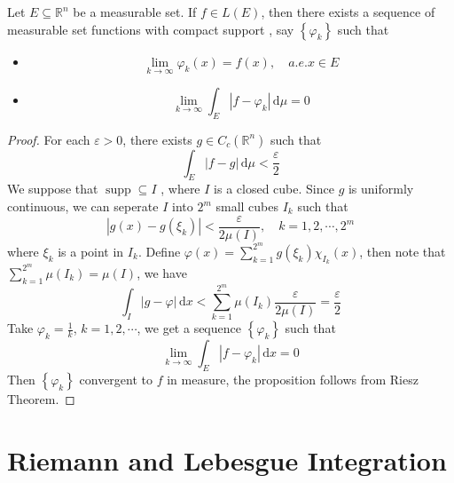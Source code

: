 \documentclass[../main.tex]{subfiles}
\begin{document}
\begin{proposition}{}{}
     Let \(  E\subseteq \mathbb{R} ^{n}  \) be a measurable set. If \(  f \in L\left( E \right)   \), then there exists a sequence of measurable set functions with compact support , say \(  \left\{  \varphi _{k} \right\}  \) such that 
    \begin{itemize}
        \item \[
        \lim_{k\to \infty} \varphi _{k}\left( x \right)= f\left( x \right),\quad a.e.x\in E  
        \]
        \item \[
      \lim_{k\to \infty}\int_{E}\left| f- \varphi _{k} \right|\,\mathrm{d} \mu = 0 
        \]
    \end{itemize}
\end{proposition}
\begin{proof}
    For each \(   \varepsilon > 0  \), there exists \(  g\in C_{c}\left( \mathbb{R}^{n} \right)   \) such that \[
    \int_{E}\left| f-g \right|\,\mathrm{d} \mu < \frac{ \varepsilon  }{2 }  
    \]  We suppose that \(  \operatorname{supp} \subseteq I  \) , where \(  I  \) is a closed cube. Since \(  g  \) is uniformly continuous, we can seperate \(  I  \) into \(  2^{m}  \) small cubes \(  I_{k}  \) such that \[
  \left| g\left( x \right)-g\left(  \xi _{k} \right)   \right|< \frac{ \varepsilon  }{2\mu \left( I \right)  }  ,\quad k= 1,2,\cdots ,2^{m}
    \]      where \(   \xi _{k}  \) is a point in \(  I_{k}  \). Define \(   \varphi \left( x \right)= \sum _{k= 1}^{2^{m}}g\left(  \xi _{k} \right)  \chi _{I_{k}}\left( x \right)   \), then note that \(  \sum _{k= 1}^{2^{m}}\mu \left( I_{k} \right)= \mu \left( I \right)    \), we have  \[
    \int_{I}\left| g- \varphi  \right|\,\mathrm{d} x<    \sum _{k= 1}^{2^{m}}\mu \left( I_{k} \right)\frac{ \varepsilon  }{2\mu \left( I \right)  }  = \frac{ \varepsilon  }{2 } 
    \]   Take \(   \varphi _{k}= \frac{1 }{k }   \), \(  k= 1,2,\cdots   \), we get a sequence  \(  \left\{  \varphi _{k} \right\}  \) such that \[
    \lim_{k\to \infty} \int_{E}\left| f- \varphi _{k} \right|\,\mathrm{d} x= 0 
    \] Then \(  \left\{  \varphi _{k} \right\}  \) convergent to \(  f  \) in measure, the proposition follows from Riesz Theorem.  
\end{proof}
 
\section{Riemann and Lebesgue Integration}
\end{document}
